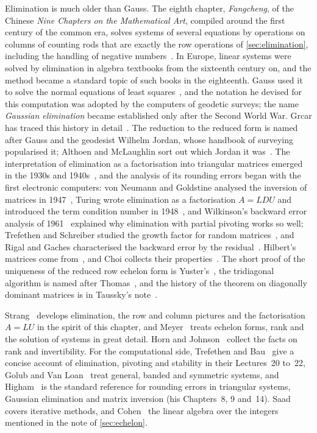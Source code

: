 Elimination is much older than Gauss. The eighth chapter, \emph{Fangcheng}, of the Chinese \emph{Nine Chapters on the Mathematical Art}, compiled around the first century of the common era, solves systems of several equations by operations on columns of counting rods that are exactly the row operations of \cref{sec:elimination}, including the handling of negative numbers~\cite{shen1999}. In Europe, linear systems were solved by elimination in algebra textbooks from the sixteenth century on, and the method became a standard topic of such books in the eighteenth. Gauss used it to solve the normal equations of least squares~\cite{gauss1809}, and the notation he devised for this computation was adopted by the computers of geodetic surveys; the name \emph{Gaussian elimination} became established only after the Second World War. Grcar has traced this history in detail~\cite{grcar2011hm,grcar2011notices}. The reduction to the reduced form is named after Gauss and the geodesist Wilhelm Jordan, whose handbook of surveying popularised it; Althoen and McLaughlin sort out which Jordan it was~\cite{althoen1987}. The interpretation of elimination as a factorisation into triangular matrices emerged in the 1930s and 1940s~\cite{grcar2011hm}, and the analysis of its rounding errors began with the first electronic computers: von Neumann and Goldstine analysed the inversion of matrices in 1947~\cite{vonneumann1947}, Turing wrote elimination as a factorisation $A=LDU$ and introduced the term condition number in 1948~\cite{turing1948}, and Wilkinson's backward error analysis of 1961~\cite{wilkinson1961} explained why elimination with partial pivoting works so well; Trefethen and Schreiber studied the growth factor for random matrices~\cite{trefethen1990}, and Rigal and Gaches characterised the backward error by the residual~\cite{rigal1967}. Hilbert's matrices come from~\cite{hilbert1894}, and Choi collects their properties~\cite{choi1983}. The short proof of the uniqueness of the reduced row echelon form is Yuster's~\cite{yuster1984}, the tridiagonal algorithm is named after Thomas~\cite{thomas1949}, and the history of the theorem on diagonally dominant matrices is in Taussky's note~\cite{taussky1949}.

Strang~\cite{strang2016} develops elimination, the row and column pictures and the factorisation $A=LU$ in the spirit of this chapter, and Meyer~\cite{meyer2000} treats echelon forms, rank and the solution of systems in great detail. Horn and Johnson~\cite[Sects.~0.4 and~0.5]{horn2013} collect the facts on rank and invertibility. For the computational side, Trefethen and Bau~\cite{trefethen1997} give a concise account of elimination, pivoting and stability in their Lectures~20 to~22, Golub and Van Loan~\cite[Chaps.~3 and~4]{golub2013} treat general, banded and symmetric systems, and Higham~\cite{higham2002accuracy} is the standard reference for rounding errors in triangular systems, Gaussian elimination and matrix inversion (his Chapters~8, 9 and~14). Saad~\cite{saad2003} covers iterative methods, and Cohen~\cite{cohen1993} the linear algebra over the integers mentioned in the note of \cref{sec:echelon}.

\chapterreferences
